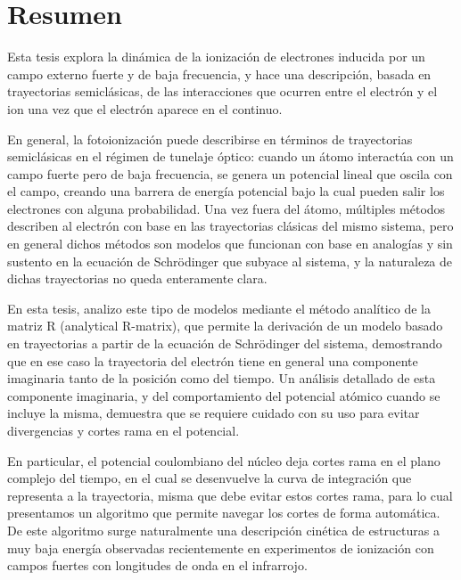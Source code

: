 \chapter*{Resumen}

Esta tesis explora la dinámica de la ionización de electrones inducida por un campo externo fuerte y de baja frecuencia, y hace una descripción, basada en trayectorias semiclásicas, de las interacciones que ocurren entre el electrón y el ion una vez que el electrón aparece en el continuo.

\vspace{\abstskip}
\noindent
En general, la fotoionización puede describirse en términos de trayectorias semiclásicas en el régimen de tunelaje óptico: cuando un átomo interactúa con un campo fuerte pero de baja frecuencia, se genera un potencial lineal que oscila con el campo, creando una barrera de energía potencial bajo la cual pueden salir los electrones con alguna probabilidad. Una vez fuera del átomo, múltiples métodos describen al electrón con base en las trayectorias clásicas del mismo sistema, pero en general dichos métodos son modelos que funcionan con base en analogías y sin sustento en la ecuación de Schrödinger que subyace al sistema, y la naturaleza de dichas trayectorias no queda enteramente clara.

\vspace{\abstskip}
\noindent
En esta tesis, analizo este tipo de modelos mediante el método analítico de la matriz R (analytical R-matrix), que permite la derivación de un modelo basado en trayectorias a partir de la ecuación de Schrödinger del sistema, demostrando que en ese caso la trayectoria del electrón tiene en general una componente imaginaria tanto de la posición como del tiempo. Un análisis detallado de esta componente imaginaria, y del comportamiento del potencial atómico cuando se incluye la misma, demuestra que se requiere cuidado con su uso para evitar divergencias y cortes rama en el potencial. 

\vspace{\abstskip}
\noindent
En particular, el potencial coulombiano del núcleo deja cortes rama en el plano complejo del tiempo, en el cual se desenvuelve la curva de integración que representa a la trayectoria, misma que debe evitar estos cortes rama, para lo cual presentamos un algoritmo que permite navegar los cortes de forma automática. De este algoritmo surge naturalmente una descripción cinética de estructuras a muy baja energía observadas recientemente en experimentos de ionización con campos fuertes con longitudes de onda en el infrarrojo.

